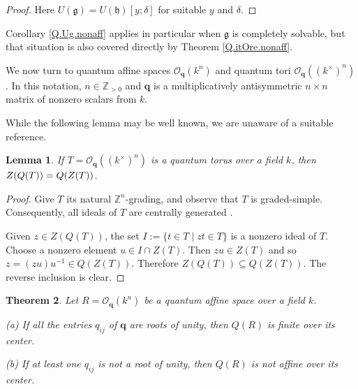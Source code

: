 \documentclass{conm-p-l}
\newtheorem{theorem}{Theorem}[section]
\newtheorem{lem}[theorem]{Lemma}
\theoremstyle{definition}
\theoremstyle{remark}
\numberwithin{equation}{section}
\newcommand{\ZZ}{\mathbb{Z}}
\newcommand \calO {{\mathcal{O}}}
\newcommand\gfrak{\mathfrak{g}}
\newcommand\hfrak{\mathfrak{h}}
\newcommand\bfq{\boldsymbol{q}}
\newcommand \Zpos {\ZZ_{> 0}}
\newcommand\Obfq{\calO_{\bfq}}
\begin{document}
\begin{proof}
Here $U(\gfrak) = U(\hfrak)[y;\delta]$ for suitable $y$ and $\delta$. 
\end{proof}

Corollary \ref{Q.Ug.nonaff} applies in particular when $\gfrak$ is completely solvable, but that situation is also covered directly by Theorem \ref{Q.itOre.nonaff}.

We now turn to quantum affine spaces $\Obfq(k^n)$ and quantum tori $\Obfq((k^\times)^n)$.  In this notation, $n \in \Zpos$ and $\bfq$ is a multiplicatively antisymmetric $n\times n$ matrix of nonzero scalars from $k$. 

While the following lemma may be well known, we are unaware of a suitable reference.

\begin{lem}  \label{ZQ=QZ.qtorus}
If $T = \Obfq((k^\times)^n)$ is a quantum torus over a field $k$, then $Z(Q(T))\linebreak = Q(Z(T))$.
\end{lem}

\begin{proof}
Give $T$ its natural $\ZZ^n$-grading, and observe that $T$ is graded-simple.  Consequently, all ideals of $T$ are centrally generated \cite[Proposition II.3.8]{Bro-Goo}.

Given $z \in Z(Q(T))$, the set $I := \{ t \in T \mid zt \in T \}$ is a nonzero ideal of $T$.  Choose a nonzero element $u \in I \cap Z(T)$.  Then $zu \in Z(T)$ and so $z = (zu)u^{-1} \in Q(Z(T))$.  Therefore $Z(Q(T)) \subseteq Q(Z(T))$.  The reverse inclusion is clear.
\end{proof}

\begin{theorem}  \label{aff.Q.qaffine} 
Let $R = \Obfq(k^n)$ be a quantum affine space over a field $k$.

{\rm(a)} If all the entries $q_{ij}$ of $\bfq$ are roots of unity, then $Q(R)$ is finite over its center.

{\rm(b)} If at least one $q_{ij}$ is not a root of unity, then $Q(R)$ is not affine over its center.
\end{theorem}
\end{document}
